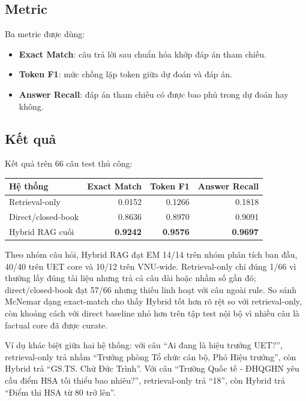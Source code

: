 \documentclass[12pt,a4paper]{article}
\begin{document}
\subsection{Metric}

Ba metric được dùng:

\begin{itemize}
  \item \textbf{Exact Match}: câu trả lời sau chuẩn hóa khớp đáp án tham chiếu.
  \item \textbf{Token F1}: mức chồng lặp token giữa dự đoán và đáp án.
  \item \textbf{Answer Recall}: đáp án tham chiếu có được bao phủ trong dự đoán hay không.
\end{itemize}

\subsection{Kết quả}

Kết quả trên 66 câu test thủ công:

\begin{center}
\small
\begin{tabular}{lrrr}
\toprule
\textbf{Hệ thống} & \textbf{Exact Match} & \textbf{Token F1} & \textbf{Answer Recall} \\
\midrule
Retrieval-only & 0.0152 & 0.1266 & 0.1818 \\
Direct/closed-book & 0.8636 & 0.8970 & 0.9091 \\
Hybrid RAG cuối & \textbf{0.9242} & \textbf{0.9576} & \textbf{0.9697} \\
\bottomrule
\end{tabular}
\end{center}

Theo nhóm câu hỏi, Hybrid RAG đạt EM 14/14 trên nhóm phân tích ban đầu, 40/40 trên UET core và 10/12 trên VNU-wide. Retrieval-only chỉ đúng 1/66 vì thường lấy đúng tài liệu nhưng trả cả câu dài hoặc nhầm số gần đó; direct/closed-book đạt 57/66 nhưng thiếu linh hoạt với câu ngoài rule. So sánh McNemar dạng exact-match cho thấy Hybrid tốt hơn rõ rệt so với retrieval-only, còn khoảng cách với direct baseline nhỏ hơn trên tập test nội bộ vì nhiều câu là factual core đã được curate.

Ví dụ khác biệt giữa hai hệ thống: với câu ``Ai đang là hiệu trưởng UET?'', retrieval-only trả nhầm ``Trưởng phòng Tổ chức cán bộ, Phó Hiệu trưởng'', còn Hybrid trả ``GS.TS. Chử Đức Trình''. Với câu ``Trường Quốc tế - ĐHQGHN yêu cầu điểm HSA tối thiểu bao nhiêu?'', retrieval-only trả ``18'', còn Hybrid trả ``Điểm thi HSA từ 80 trở lên''.
\end{document}
